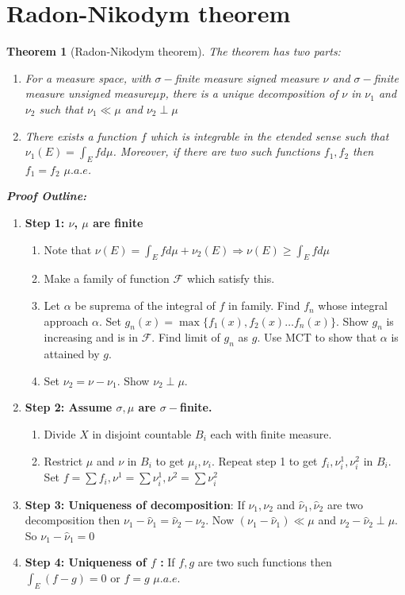 \documentclass[notoc]{tufte-book}
\newtheorem{theorem}{Theorem}
\begin{document}
\section{Radon-Nikodym theorem}
\begin{theorem}[Radon-Nikodym theorem]
	The theorem has two parts:
	\begin{enumerate}
		\item For a measure space, with $\sigma-$finite measure signed measure $\nu$ and  $\sigma-$finite measure unsigned measure$\mu$p, there is a unique decomposition of $\nu$ in $\nu_1$ and $\nu_2$ such that $\nu_1\ll\mu$ and $\nu_2\perp\mu$
		\item There exists a function $f$ which is integrable in the etended sense such that $\nu_1(E)=\int_Efd\mu$. Moreover, if there are two such functions $f_1,f_2$ then $f_1=f_2$ $\mu.a.e$. 
	\end{enumerate}
\end{theorem}
\textbf{\textit{Proof Outline:}}\\
\begin{enumerate}
	\item \textbf{Step 1: $\nu$, $\mu$ are finite}\\
		\begin{enumerate}
			\item Note that $\nu(E)=\int_Efd\mu+\nu_2(E)\Rightarrow \nu(E)\geq\int_Efd\mu$
			\item Make a family of function $\mathcal{F}$ which satisfy this. 
			\item Let $\alpha$ be suprema of the integral of $f$ in family. Find $f_n$ whose integral approach $\alpha$. Set $g_n(x)=\max\{f_1(x),f_2(x)\hdots f_n(x)\}$. Show $g_n$ is increasing and is in $\mathcal{ F}$. Find limit of $g_n$ as $g$. Use MCT to show that $\alpha$ is attained by $g$.
			\item  Set $\nu_2=\nu-\nu_1$. Show $\nu_2\perp\mu$. 
		\end{enumerate}
	\item  \textbf{Step 2: Assume $\sigma,\mu$ are $\sigma-$finite.}
	\begin{enumerate}
		\item Divide $X$ in disjoint countable $B_i$ each with finite measure.
		\item Restrict $\mu$ and $\nu$ in $B_i$ to get $\mu_i,\nu_i$. Repeat step 1 to get $f_i,\nu^1_i,\nu^2_i$ in $B_i$. Set $f=\sum f_i,\nu^1=\sum\nu^1_i,\nu^2=\sum\nu^2_i$
	\end{enumerate} 
	\item \textbf{Step 3: Uniqueness of decomposition}:
	If $\nu_1,\nu_2$ and $\hat\nu_1,\hat\nu_2$ are two decomposition then $\nu_1-\hat\nu_1=\hat\nu_2-\nu_2$. Now $(\nu_1-\hat\nu_1)\ll\mu$ and $\nu_2-\hat\nu_2\perp\mu$. So $\nu_1-\hat\nu_1=0$
	\item \textbf{Step 4: Uniqueness of $f$ :}
	If $f,g$ are two such functions then $\int_E(f-g)=0$ or $f=g$ $\mu.a.e$.  	
\end{enumerate}
\end{document}
